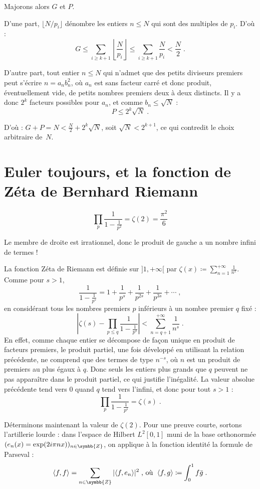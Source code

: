 \documentclass[a4paper,11pt]{article}
\newcommand{\Z}{\ensuremath{\symbb{Z}}\xspace}
\begin{document}
Majorons alors $G$ et $P$.

D'une part, $\lfloor N/p_i\rfloor$ dénombre les entiers $n\le N$
qui sont des multiples de $p_i$. D'où :
\[
  G \le \sum_{i\ge k+1} \left\lfloor\frac{N}{p_i}\right\rfloor
    \le \sum_{i\ge k+1} \frac{N}{p_i} < \frac{N}{2} \;.
\]

D'autre part, tout entier $n\le N$ qui n'admet que des petits
diviseurs premiers peut s'écrire $n=a_n b_n^2$, où $a_n$ est sans facteur
carré et donc produit, éventuellement vide, de petits nombres premiers
deux à deux distincts. Il y a donc $2^k$ facteurs possibles pour $a_n$,
et comme $b_n\le\sqrt{N}$ :
\[
  P \le 2^k \sqrt{N} \;.
\]

D'où : $\displaystyle G+P=N < \frac{N}{2} + 2^k \sqrt{N}$, soit
$\sqrt{N}<2^{k+1}$, ce qui contredit le choix arbitraire de~$N$.

\section{Euler toujours, et la fonction de Zéta de Bernhard Riemann}

\[
  \prod_p \frac{1}{1-\frac{1}{p^2}} = \zeta(2) = \frac{\pi^2}{6}
\]

Le membre de droite est irrationnel, donc le produit de gauche a un
nombre infini de termes !

\smallskip
La fonction Zéta de Riemann est définie sur $]1, +\infty[$ par
$\displaystyle\zeta(x) \coloneq \sum_{n=1}^{+\infty} \frac{1}{n^x}$.
Comme pour $s>1$,
\[
  \frac{1}{1-\frac{1}{p^s}} = 1+\frac{1}{p^s}+\frac{1}{p^{2s}}+
                              \frac{1}{p^{3s}}+\cdots \;,
\]
en considérant tous les nombres premiers $p$ inférieurs à un nombre premier
$q$ fixé :
\[
  \left\vert\zeta(s)-\prod_{p\le q} \frac{1}{1-\frac{1}{p^s}}\right\vert
  < \sum_{n=q+1}^{+\infty} \frac{1}{n^s} \;.
\]
En effet, comme chaque entier se décompose de façon unique en produit de
facteurs premiers, le produit partiel, une fois développé en utilisant la
relation précédente, ne comprend que des termes de type $n^{-s}$, où $n$
est un produit de premiers au plus égaux à $q$. Donc seuls les entiers
plus grands que $q$ peuvent ne pas apparaître dans le produit partiel,
ce qui justifie l'inégalité.
La valeur absolue précédente tend vers $0$ quand $q$ tend vers l'infini,
et donc pour tout $s>1$ :
\[
  \prod_p \frac{1}{1-\frac{1}{p^s}} = \zeta(s) \;.
\]

Déterminons maintenant la valeur de $\zeta(2)$. Pour une preuve courte,
sortons l'artillerie lourde : dans l'espace de Hilbert $L^2[0,1]$ muni de
la base orthonormée $(e_n(x)=\exp(2i\pi n x))_{n\in\Z}$, on applique à la
fonction identité la formule de Parseval :
\[
  \langle f,f\rangle=\sum_{n\in\Z}\vert\langle f,e_n\rangle\vert^2 \;
  \mbox{, où }\; \langle f,g\rangle \coloneq \int_0^1f\bar g \;.
\]
\end{document}
